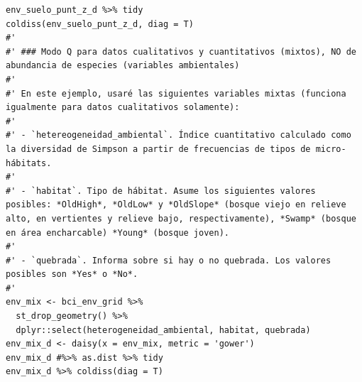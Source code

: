 \documentclass[11pt,]{article}
\begin{document}
\begin{verbatim}
env_suelo_punt_z_d %>% tidy
coldiss(env_suelo_punt_z_d, diag = T)
#'
#' ### Modo Q para datos cualitativos y cuantitativos (mixtos), NO de abundancia de especies (variables ambientales)
#' 
#' En este ejemplo, usaré las siguientes variables mixtas (funciona igualmente para datos cualitativos solamente):
#' 
#' - `hetereogeneidad_ambiental`. Índice cuantitativo calculado como la diversidad de Simpson a partir de frecuencias de tipos de micro-hábitats.
#' 
#' - `habitat`. Tipo de hábitat. Asume los siguientes valores posibles: *OldHigh*, *OldLow* y *OldSlope* (bosque viejo en relieve alto, en vertientes y relieve bajo, respectivamente), *Swamp* (bosque en área encharcable) *Young* (bosque joven).
#' 
#' - `quebrada`. Informa sobre si hay o no quebrada. Los valores posibles son *Yes* o *No*.
#' 
env_mix <- bci_env_grid %>%
  st_drop_geometry() %>%
  dplyr::select(heterogeneidad_ambiental, habitat, quebrada)
env_mix_d <- daisy(x = env_mix, metric = 'gower')
env_mix_d #%>% as.dist %>% tidy
env_mix_d %>% coldiss(diag = T)
\end{verbatim}
\end{document}

